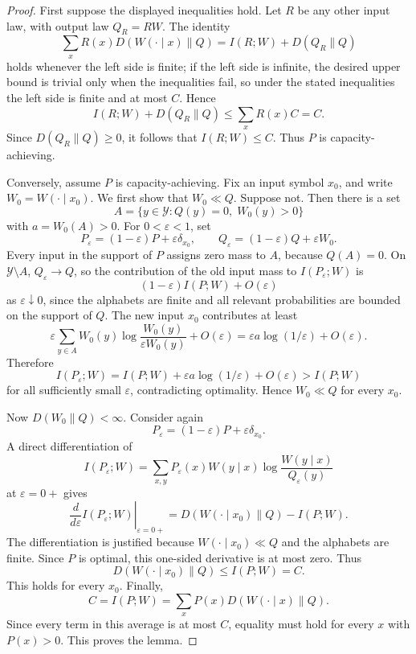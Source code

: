 \documentclass[11pt]{article}
\theoremstyle{definition}
\theoremstyle{remark}
\newcommand{\1}{\mathbf 1}
\begin{document}
\begin{proof}
First suppose the displayed inequalities hold.  Let \(R\) be any other input law, with output law \(Q_R=RW\).  The identity
\[
  \sum_x R(x)D(W(\cdot\mid x)\|Q)=I(R;W)+D(Q_R\|Q)
\]
holds whenever the left side is finite; if the left side is infinite, the desired upper bound is trivial only when the inequalities fail, so under the stated inequalities the left side is finite and at most \(C\).  Hence
\[
  I(R;W)+D(Q_R\|Q)\le \sum_x R(x)C=C.
\]
Since \(D(Q_R\|Q)\ge0\), it follows that \(I(R;W)\le C\).  Thus \(P\) is capacity-achieving.

Conversely, assume \(P\) is capacity-achieving.  Fix an input symbol \(x_0\), and write \(W_0=W(\cdot\mid x_0)\).  We first show that \(W_0\ll Q\).  Suppose not.  Then there is a set
\[
  A=\{y\in\mathcal Y:Q(y)=0,\; W_0(y)>0\}
\]
with \(a=W_0(A)>0\).  For \(0<\varepsilon<1\), set
\[
  P_\varepsilon=(1-\varepsilon)P+\varepsilon\delta_{x_0},
  \qquad
  Q_\varepsilon=(1-\varepsilon)Q+\varepsilon W_0.
\]
Every input in the support of \(P\) assigns zero mass to \(A\), because \(Q(A)=0\).  On \(\mathcal Y\setminus A\), \(Q_\varepsilon\to Q\), so the contribution of the old input mass to \(I(P_\varepsilon;W)\) is
\[
  (1-\varepsilon)I(P;W)+O(\varepsilon)
\]
as \(\varepsilon\downarrow0\), since the alphabets are finite and all relevant probabilities are bounded on the support of \(Q\).  The new input \(x_0\) contributes at least
\[
  \varepsilon\sum_{y\in A}W_0(y)\log\frac{W_0(y)}{\varepsilon W_0(y)} + O(\varepsilon)
  =\varepsilon a\log(1/\varepsilon)+O(\varepsilon).
\]
Therefore
\[
  I(P_\varepsilon;W)=I(P;W)+\varepsilon a\log(1/\varepsilon)+O(\varepsilon)>I(P;W)
\]
for all sufficiently small \(\varepsilon\), contradicting optimality.  Hence \(W_0\ll Q\) for every \(x_0\).

Now \(D(W_0\|Q)<\infty\).  Consider again
\[
  P_\varepsilon=(1-\varepsilon)P+\varepsilon\delta_{x_0}.
\]
A direct differentiation of
\[
  I(P_\varepsilon;W)=
  \sum_{x,y}P_\varepsilon(x)W(y\mid x)
  \log\frac{W(y\mid x)}{Q_\varepsilon(y)}
\]
at \(\varepsilon=0+\) gives
\[
  \left.\frac{d}{d\varepsilon}I(P_\varepsilon;W)\right|_{\varepsilon=0+}
  =D(W(\cdot\mid x_0)\|Q)-I(P;W).
\]
The differentiation is justified because \(W(\cdot\mid x_0)\ll Q\) and the alphabets are finite.  Since \(P\) is optimal, this one-sided derivative is at most zero.  Thus
\[
  D(W(\cdot\mid x_0)\|Q)
  \le I(P;W)=C.
\]
This holds for every \(x_0\).  Finally,
\[
  C=I(P;W)=\sum_x P(x)D(W(\cdot\mid x)\|Q).
\]
Since every term in this average is at most \(C\), equality must hold for every \(x\) with \(P(x)>0\).  This proves the lemma.
\end{proof}
\end{document}
